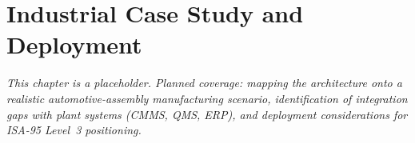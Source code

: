 \chapter{Industrial Case Study and Deployment}
\label{ch:industrial}

\textit{This chapter is a placeholder. Planned coverage: mapping the
\NEXUS{} architecture onto a realistic automotive-assembly
manufacturing scenario, identification of integration gaps with plant
systems (CMMS, QMS, ERP), and deployment considerations for ISA-95
Level~3 positioning.}
